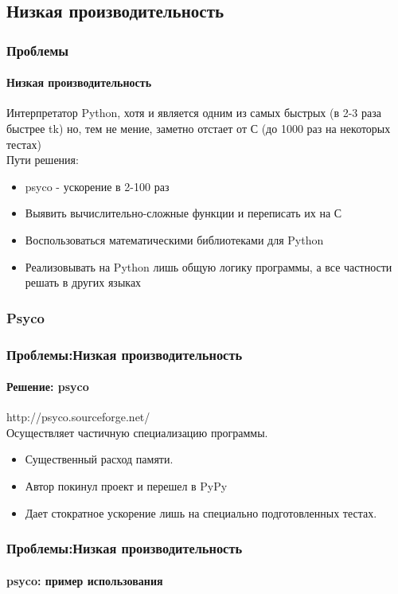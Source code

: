 \documentclass{beamer}
\begin{document}
\subsection{Низкая производительность}
\begin{frame}
\frametitle{Проблемы}
\framesubtitle{Низкая производительность}
Интерпретатор Python, хотя и является одним из самых быстрых (в 2-3 раза быстрее tk) но, тем не мение, заметно отстает от С (до
1000 раз на некоторых тестах)
\\
Пути решения:
\begin{itemize}
	\item<1> psyco - ускорение в 2-100 раз
	\item<1> Выявить вычислительно-сложные функции и переписать их на С
	\item<1> Воспользоваться математическими библиотеками для Python
	\item<1> Реализовывать на Python лишь общую логику программы, а все частности решать в других языках
\end{itemize}
\end{frame}

\subsubsection{Psyco}
\begin{frame}
\frametitle{Проблемы:Низкая производительность}
\framesubtitle{Решение: psyco}
http://psyco.sourceforge.net/
\\
Осуществляет частичную специализацию программы.
\begin{itemize}
	\item<1> Существенный расход памяти.
	\item<1> Автор покинул проект и перешел в PyPy
	\item<1> Дает стократное ускорение лишь на специально подготовленных тестах.
\end{itemize}
\end{frame}
\begin{frame}
\frametitle{Проблемы:Низкая производительность}
\framesubtitle{psyco: пример использования}

\end{frame}
\end{document}

